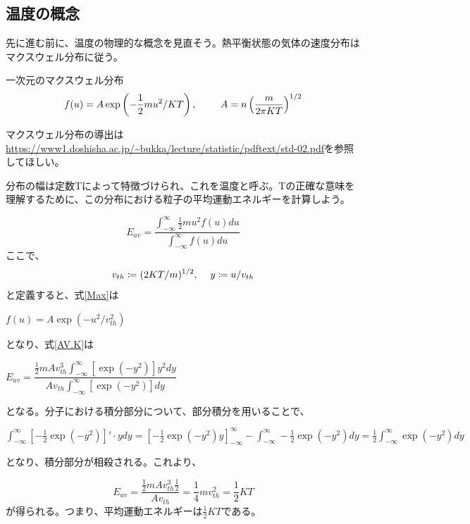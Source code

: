 \documentclass{ltjsarticle}
\numberwithin{equation}{section} %
\begin{document}
\subsection{温度の概念}
先に進む前に、温度の物理的な概念を見直そう。熱平衡状態の気体の速度分布はマクスウェル分布に従う。

\begin{eqbox}{一次元のマクスウェル分布}
\begin{equation}
f(u) = A \exp\left(-\frac{1}{2}mu^2/KT\right),\hspace{2pc} A = n\left(\frac{m}{2\pi KT}\right)^{1/2} \label{Max}
\end{equation}
\end{eqbox}

マクスウェル分布の導出は\url{https://www1.doshisha.ac.jp/~bukka/lecture/statistic/pdftext/std-02.pdf}を参照してほしい。

分布の幅は定数Tによって特徴づけられ、これを温度と呼ぶ。Tの正確な意味を理解するために、この分布における粒子の平均運動エネルギーを計算しよう。

\begin{equation}
 E_{av} = \frac{\int_{-\infty}^{\infty} \frac{1}{2}mu^2 f(u)du}{\int_{-\infty}^{\infty} f(u)du} \label{AV.K}
\end{equation}
ここで、
\begin{equation}
  v_{th} \coloneqq (2KT/m)^{1/2}, \hspace{1pc} y \coloneqq u/v_{th}
\end{equation}
と定義すると、式\eqref{Max}は

\begin{center}
 $f(u) = A \exp(-u^2/v^2_{th})$ 
\end{center}
となり、式\eqref{AV.K}は

\begin{center}
  $E_{av} = \dfrac{\frac{1}{2}mAv^3_{th}\int_{-\infty}^{\infty}[\exp(-y^2)]y^2dy}{Av_{th}\int_{-\infty}^{\infty}[\exp(-y^2)]dy}$
\end{center}
となる。分子における積分部分について、部分積分を用いることで、

\begin{center}
  $\int_{-\infty}^{\infty} [-\frac{1}{2}\exp(-y^2)]'\cdot ydy = \left[-\frac{1}{2}\exp(-y^2)y\right]_{-\infty}^{\infty} - \int_{-\infty}^{\infty} -\frac{1}{2}\exp(-y^2)dy
  = \frac{1}{2}\int_{-\infty}^{\infty}\exp(-y^2)dy $
\end{center}
となり、積分部分が相殺される。これより、

\begin{equation}
  E_{av} = \frac{\frac{1}{2}mAv_{th}^3\frac{1}{2}}{Av_{th}} = \frac{1}{4}mv_{th}^2 = \frac{1}{2}KT
\end{equation}
が得られる。つまり、平均運動エネルギーは$\frac{1}{2}KT$である。
\end{document}
